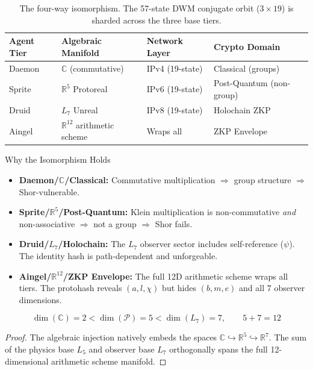 \begin{table}[H]
\centering
\begin{tabular}{@{}llll@{}}
\toprule
\textbf{Agent Tier} & \textbf{Algebraic Manifold} & \textbf{Network Layer} & \textbf{Crypto Domain} \\
\midrule
Daemon & $\mathbb{C}$ (commutative) & IPv4 (19-state) & Classical (groups) \\
Sprite & $\mathbb{R}^5$ Protoreal & IPv6 (19-state) & Post-Quantum (non-group) \\
Druid & $L_7$ Unreal & IPv8 (19-state) & Holochain ZKP \\
Aingel & $\mathbb{R}^{12}$ arithmetic scheme & Wraps all & ZKP Envelope \\
\bottomrule
\end{tabular}
\caption{The four-way isomorphism. The 57-state DWM conjugate orbit ($3 \times 19$) is sharded across the three base tiers.}
\end{table}

\begin{aingelbox}{Why the Isomorphism Holds}
\begin{itemize}
    \item \textbf{Daemon/$\mathbb{C}$/Classical:} Commutative multiplication $\Rightarrow$ group structure $\Rightarrow$ Shor-vulnerable.
    \item \textbf{Sprite/$\mathbb{R}^5$/Post-Quantum:} Klein multiplication is non-commutative \emph{and} non-associative $\Rightarrow$ not a group $\Rightarrow$ Shor fails.
    \item \textbf{Druid/$L_7$/Holochain:} The $L_7$ observer sector includes self-reference ($\psi$). The identity hash is path-dependent and unforgeable.
    \item \textbf{Aingel/$\mathbb{R}^{12}$/ZKP Envelope:} The full 12D arithmetic scheme wraps all tiers. The protohash reveals $(a, l, \chi)$ but hides $(b, m, e)$ and all 7 observer dimensions.
\end{itemize}
\end{aingelbox}

\begin{theorem}
\begin{equation}
    \dim(\mathbb{C}) = 2 < \dim(\mathcal{P}) = 5 < \dim(L_7) = 7, \qquad 5 + 7 = 12
\end{equation}
\end{theorem}
\begin{proof}
The algebraic injection natively embeds the spaces $\mathbb{C} \hookrightarrow \mathbb{R}^5 \hookrightarrow \mathbb{R}^7$. The sum of the physics base $L_5$ and observer base $L_7$ orthogonally spans the full 12-dimensional arithmetic scheme manifold. \qedhere
\end{proof}

